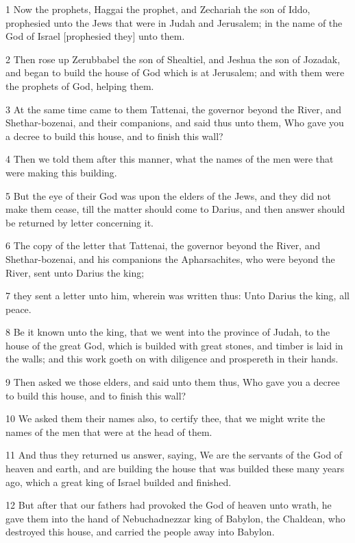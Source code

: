 \par 1 Now the prophets, Haggai the prophet, and Zechariah the son of Iddo, prophesied unto the Jews that were in Judah and Jerusalem; in the name of the God of Israel [prophesied they] unto them.
\par 2 Then rose up Zerubbabel the son of Shealtiel, and Jeshua the son of Jozadak, and began to build the house of God which is at Jerusalem; and with them were the prophets of God, helping them.
\par 3 At the same time came to them Tattenai, the governor beyond the River, and Shethar-bozenai, and their companions, and said thus unto them, Who gave you a decree to build this house, and to finish this wall?
\par 4 Then we told them after this manner, what the names of the men were that were making this building.
\par 5 But the eye of their God was upon the elders of the Jews, and they did not make them cease, till the matter should come to Darius, and then answer should be returned by letter concerning it.
\par 6 The copy of the letter that Tattenai, the governor beyond the River, and Shethar-bozenai, and his companions the Apharsachites, who were beyond the River, sent unto Darius the king;
\par 7 they sent a letter unto him, wherein was written thus: Unto Darius the king, all peace.
\par 8 Be it known unto the king, that we went into the province of Judah, to the house of the great God, which is builded with great stones, and timber is laid in the walls; and this work goeth on with diligence and prospereth in their hands.
\par 9 Then asked we those elders, and said unto them thus, Who gave you a decree to build this house, and to finish this wall?
\par 10 We asked them their names also, to certify thee, that we might write the names of the men that were at the head of them.
\par 11 And thus they returned us answer, saying, We are the servants of the God of heaven and earth, and are building the house that was builded these many years ago, which a great king of Israel builded and finished.
\par 12 But after that our fathers had provoked the God of heaven unto wrath, he gave them into the hand of Nebuchadnezzar king of Babylon, the Chaldean, who destroyed this house, and carried the people away into Babylon.
